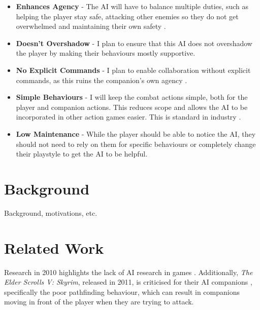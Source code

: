 \documentclass{IEEEtran}
\begin{document}
\label{CoreDesign}
\begin{itemize}
	\item \textbf{Enhances Agency} - The AI will have to balance multiple duties, such as helping the player stay safe, attacking other enemies so they do not get overwhelmed and maintaining their own safety \cite{CoupledEmpowermentMaximisation, tremblay2013adaptive}.
	\item \textbf{Doesn't Overshadow} - I plan to ensure that this AI does not overshadow the player \cite{CoupledEmpowermentMaximisation, DesignDocAIAllies} by making their behaviours mostly supportive.
	\item \textbf{No Explicit Commands} - I plan to enable collaboration without explicit commands, as this ruins the companion's own agency \cite{EGXCharacterDeathGuildWars}.
	\item \textbf{Simple Behaviours} - I will keep the combat actions simple, both for the player and companion actions. This reduces scope and allows the AI to be incorporated in other action games easier. This is standard in industry \cite{GMTGoodAI, GDCLessIsMore, GDCSimplestAITrick}.
	\item \textbf{Low Maintenance} - While the player should be able to notice the AI, they should not need to rely on them for specific behaviours or completely change their playstyle to get the AI to be helpful.
\end{itemize}

\section{Background}
\label{Background}

Background, motivations, etc.

\section{Related Work}
\label{RelatedWork}

Research in 2010 highlights the lack of AI research in games \cite{RealTimeAICritique2010}. Additionally, \textit{The Elder Scrolls V: Skyrim}, released in 2011, is criticised for their AI companions \cite{tremblay2013adaptive}, specifically the poor pathfinding behaviour, which can result in companions moving in front of the player when they are trying to attack.

\end{document}

